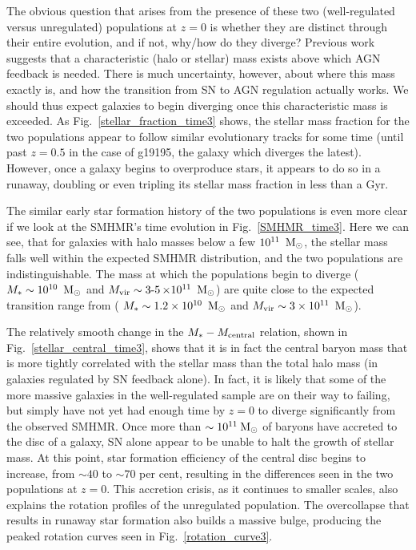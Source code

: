 The obvious question that arises from the presence of these two (well-regulated
versus  unregulated) populations at $z=0$ is whether they are distinct through
their entire evolution, and if not, why/how do they diverge?  Previous work
suggests that a characteristic (halo or stellar) mass exists above which AGN
feedback is needed.  There is much uncertainty, however, about where this mass
exactly is, and how the transition from SN to AGN regulation actually works. We
should thus expect galaxies to begin diverging once this characteristic mass is
exceeded.  As Fig.~\ref{stellar_fraction_time3} shows, the stellar mass
fraction for the two populations appear to follow similar evolutionary tracks
for some time (until past $z=0.5$ in the case of g19195, the galaxy which
diverges the latest).  However, once a galaxy begins to overproduce stars, it
appears to do so in a runaway, doubling or even tripling its stellar mass
fraction in less than a Gyr.

The similar early star formation history of the two populations is even more
clear if we look at the SMHMR's time evolution in Fig.~\ref{SMHMR_time3}.  Here
we can see, that for galaxies with halo masses below a few $10^{11}\;\>{\rm M_{\odot}}$,
the stellar mass falls well within the expected SMHMR distribution, and the two
populations are indistinguishable.  The mass at which the populations begin to
diverge ( $M_*\sim10^{10}\;\>{\rm M_{\odot}}$ and $M_{\rm vir}\sim\operatorname{3-
5}\times10^{11}\;\>{\rm M_{\odot}}$) are quite close to the expected transition range
from \citet{Shankar2006} ( $M_*\sim1.2\times10^{10}\;\>{\rm M_{\odot}}$ and
$M_{\rm vir}\sim3\times10^{11}\;\>{\rm M_{\odot}}$).

The relatively smooth change in the $M_*-M_{\rm central}$ relation, shown in
Fig.~\ref{stellar_central_time3}, shows that it is in fact the central baryon
mass that is more tightly correlated with the stellar mass than the total halo
mass (in galaxies regulated by SN feedback alone). In fact, it is likely that
some of the more massive galaxies in the well-regulated sample are on their way
to failing, but simply have not yet had enough time by $z=0$ to diverge
significantly from the observed SMHMR.  Once more than $\sim10^{11}\>{\rm M_{\odot}}$ of
baryons have accreted to the disc of a galaxy, SN alone appear to be unable to
halt the growth of stellar mass.  At this point, star formation efficiency of
the central disc begins to increase, from $\sim40$ to $\sim70$ per cent, resulting in
the differences seen in the two populations at $z=0$.  This accretion crisis, as
it continues to smaller scales, also explains the rotation profiles of the
unregulated population.  The overcollapse that results in runaway star formation
also builds a massive bulge, producing the peaked rotation curves seen in
Fig.~\ref{rotation_curve3}.

